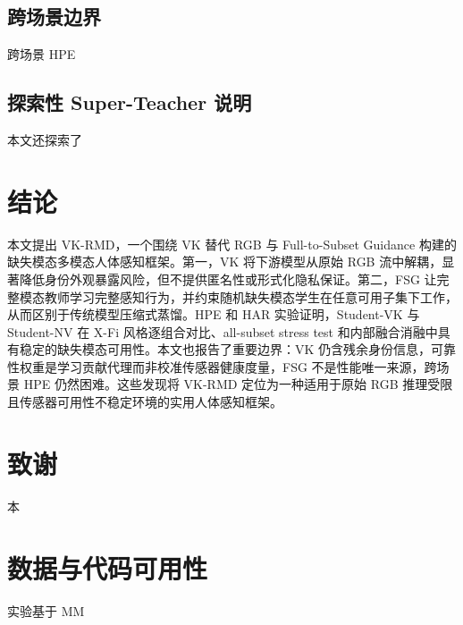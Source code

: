 \documentclass[UTF8,twocolumn]{ctexart}
\newcommand{\method}{VK-RMD}
\begin{document}
\subsection{跨场景边界}
跨场景 HPE

\subsection{探索性 Super-Teacher 说明}
本文还探索了

\section{结论}
本文提出 \method{}，一个围绕 VK 替代 RGB 与 Full-to-Subset Guidance 构建的缺失模态多模态人体感知框架。第一，VK 将下游模型从原始 RGB 流中解耦，显著降低身份外观暴露风险，但不提供匿名性或形式化隐私保证。第二，FSG 让完整模态教师学习完整感知行为，并约束随机缺失模态学生在任意可用子集下工作，从而区别于传统模型压缩式蒸馏。HPE 和 HAR 实验证明，Student-VK 与 Student-NV 在 X-Fi 风格逐组合对比、all-subset stress test 和内部融合消融中具有稳定的缺失模态可用性。本文也报告了重要边界：VK 仍含残余身份信息，可靠性权重是学习贡献代理而非校准传感器健康度量，FSG 不是性能唯一来源，跨场景 HPE 仍然困难。这些发现将 \method{} 定位为一种适用于原始 RGB 推理受限且传感器可用性不稳定环境的实用人体感知框架。

\section*{致谢}
本

\section*{数据与代码可用性}
实验基于 MM
\balance
\end{document}
